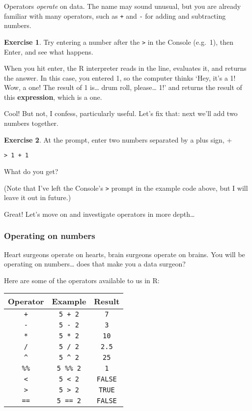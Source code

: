\documentclass[
]{article}
\theoremstyle{definition}
\theoremstyle{definition}
\theoremstyle{definition}
\newtheorem{exercise}{Exercise}[section]
\theoremstyle{definition}
\theoremstyle{remark}
\begin{document}
Operators \emph{operate} on data. The name may sound unusual, but you are already familiar with many operators, such as \texttt{+} and \texttt{-} for adding and subtracting numbers.

\begin{exercise}
Try entering a number after the \texttt{\textgreater{}} in the Console (e.g.~1), then Enter, and see what happens.
\end{exercise}

When you hit enter, the R interpreter reads in the line, evaluates it, and returns the answer. In this case, you entered 1, so the computer thinks `Hey, it's a 1! Wow, a one! The result of 1 is\ldots{} drum roll, please\ldots{} 1!' and returns the result of this \textbf{expression}, which is a one.

Cool! But not, I confess, particularly useful. Let's fix that: next we'll add two numbers together.

\begin{exercise}
At the prompt, enter two numbers separated by a plus sign, +

\texttt{\textgreater{}\ 1\ +\ 1}

What do you get?
\end{exercise}

(Note that I've left the Console's \texttt{\textgreater{}} prompt in the example code above, but I will leave it out in future.)

Great! Let's move on and investigate operators in more depth\ldots{}

\hypertarget{operating-on-numbers}{%
\subsubsection{Operating on numbers}\label{operating-on-numbers}}

Heart surgeons operate on hearts, brain surgeons operate on brains.
You will be operating on numbers\ldots{} does that make you a data surgeon?

Here are some of the operators available to us in R:

\begin{longtable}[]{@{}ccc@{}}
\toprule()
Operator & Example & Result \\
\midrule()
\endhead
\texttt{+} & \texttt{5\ +\ 2} & \texttt{7} \\
\texttt{-} & \texttt{5\ -\ 2} & \texttt{3} \\
\texttt{*} & \texttt{5\ *\ 2} & \texttt{10} \\
\texttt{/} & \texttt{5\ /\ 2} & \texttt{2.5} \\
\texttt{\^{}} & \texttt{5\ \^{}\ 2} & \texttt{25} \\
\texttt{\%\%} & \texttt{5\ \%\%\ 2} & \texttt{1} \\
\texttt{\textless{}} & \texttt{5\ \textless{}\ 2} & \texttt{FALSE} \\
\texttt{\textgreater{}} & \texttt{5\ \textgreater{}\ 2} & \texttt{TRUE} \\
\texttt{==} & \texttt{5\ ==\ 2} & \texttt{FALSE} \\
\bottomrule()
\end{longtable}
\end{document}
